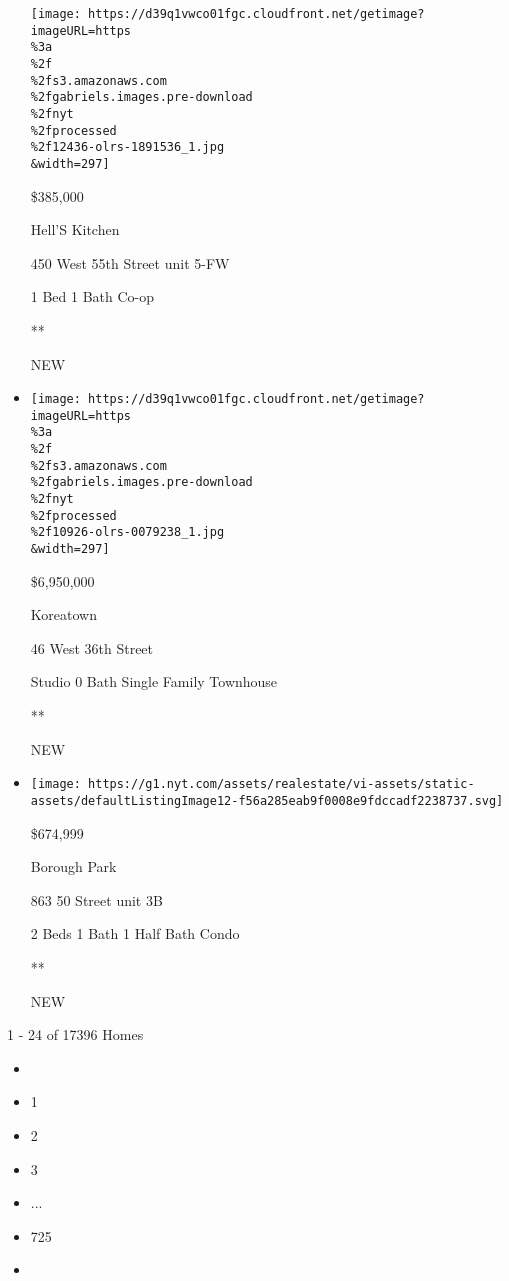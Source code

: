 \begin{itemize}
  \texttt{[image: https://d39q1vwco01fgc.cloudfront.net/getimage?imageURL=https\\\%3a\\\%2f\\\%2fs3.amazonaws.com\\\%2fgabriels.images.pre-download\\\%2fnyt\\\%2fprocessed\\\%2f12436-olrs-1891536\_1.jpg\\\&width=297]}

  \$385,000

  Hell'S Kitchen

  450 West 55th Street unit 5-FW

  1 Bed \textbar{} 1 Bath \textbar{} Co-op

  **

  NEW
\item
  \href{/real-estate/usa/ny/new-york/koreatown/homes-for-sale/46-west-36th-street/10926-OLRS-0079238?}{}

  \texttt{[image: https://d39q1vwco01fgc.cloudfront.net/getimage?imageURL=https\\\%3a\\\%2f\\\%2fs3.amazonaws.com\\\%2fgabriels.images.pre-download\\\%2fnyt\\\%2fprocessed\\\%2f10926-olrs-0079238\_1.jpg\\\&width=297]}

  \$6,950,000

  Koreatown

  46 West 36th Street

  Studio \textbar{} 0 Bath \textbar{} Single Family Townhouse

  **

  NEW
\item
  \href{/real-estate/usa/ny/brooklyn/borough-park/homes-for-sale/863-50-street/15091-5522733?}{}

  \texttt{[image: https://g1.nyt.com/assets/realestate/vi-assets/static-assets/defaultListingImage12-f56a285eab9f0008e9fdccadf2238737.svg]}

  \$674,999

  Borough Park

  863 50 Street unit 3B

  2 Beds \textbar{} 1 Bath \textbar{} 1 Half Bath \textbar{} Condo

  **

  NEW
\end{itemize}

1 - 24 of 17396 Homes

\begin{itemize}
\item
\item
  1
\item
  2
\item
  3
\item
  ...
\item
  725
\item
\end{itemize}

